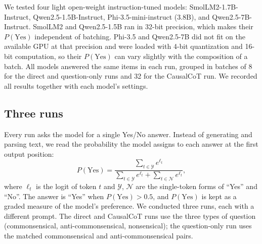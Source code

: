 \documentclass{llncs}
\begin{document}
We tested four light open-weight instruction-tuned models: SmolLM2-1.7B-Instruct, Qwen2.5-1.5B-Instruct, Phi-3.5-mini-instruct (3.8B), and Qwen2.5-7B-Instruct. SmolLM2 and Qwen2.5-1.5B ran in 32-bit precision, which makes their $P(\text{Yes})$ independent of batching. Phi-3.5 and Qwen2.5-7B did not fit on the available GPU at that precision and were loaded with 4-bit quantization and 16-bit computation, so their $P(\text{Yes})$ can vary slightly with the composition of a batch. All models answered the same items in each run, grouped in batches of 8 for the direct and question-only runs and 32 for the CausalCoT run. We recorded all results together with each model's settings.

\subsection{Three runs}
\label{sec:runs}

Every run asks the model for a single Yes/No answer. Instead of generating and parsing text, we read the probability the model assigns to each answer at the first output position:
\[
P(\text{Yes}) = \frac{\sum_{t \in \mathcal{Y}} e^{\ell_t}}{\sum_{t \in \mathcal{Y}} e^{\ell_t} + \sum_{t \in \mathcal{N}} e^{\ell_t}},
\]
where $\ell_t$ is the logit of token $t$ and $\mathcal{Y}$, $\mathcal{N}$ are the single-token forms of ``Yes'' and ``No''. The answer is ``Yes'' when $P(\text{Yes}) > 0.5$, and $P(\text{Yes})$ is kept as a graded measure of the model's preference. We conducted three runs, each with a different prompt. The direct and CausalCoT runs use the three types of question (commonsensical, anti-commonsensical, nonsensical); the question-only run uses the matched commonsensical and anti-commonsensical pairs.
\end{document}
